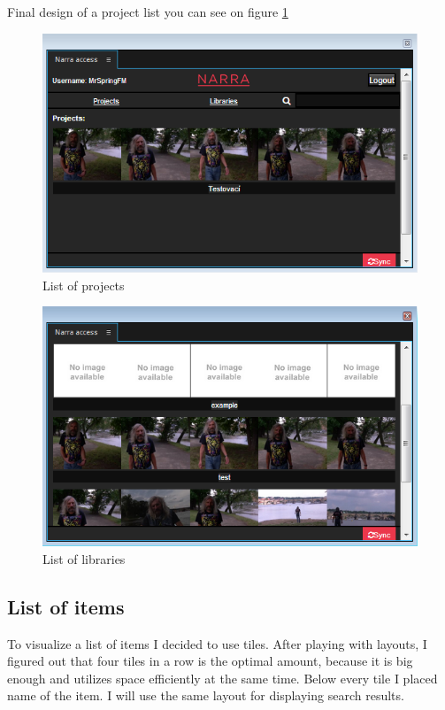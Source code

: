 \documentclass[thesis=B,english]{FITthesis}[2012/10/20]
\begin{document}
Final design of a project list you can see on figure \ref{fig:projects}
	\begin{figure}
		\centering
		\includegraphics[width=1\textwidth]{Projects.png}
		\caption{List of projects}\label{fig:projects}
	\end{figure}
	\begin{figure}
		\centering
		\includegraphics[width=1\textwidth]{libraries.png}
		\caption{List of libraries}\label{fig:libraries}
	\end{figure}
\subsection{List of items}
To visualize a list of items I decided to use tiles. After playing with layouts, I figured out that four tiles in a row is the optimal amount, because it is big enough and utilizes space efficiently at the same time. Below every tile I placed name of the item. I will use the same layout for displaying search results.
\end{document}
